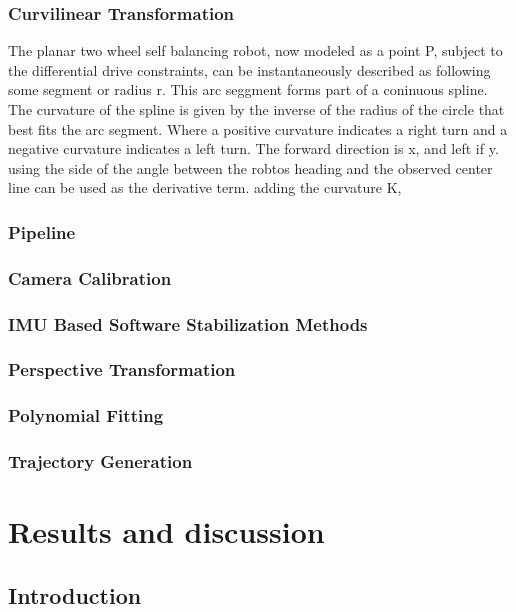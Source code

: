         \subsubsection{Curvilinear Transformation}
        The planar two wheel self balancing robot, now modeled as a point P, subject to the differential drive constraints, 
        can be instantaneously described as following some segment or radius r. This arc seggment forms part of a coninuous spline. 
        The curvature of the spline is given by the inverse of the radius of the circle that best fits the arc segment.
        Where a positive curvature indicates a right turn and a negative curvature indicates a left turn.
        The forward direction is x, and left if y. using the side of the angle between the robtos heading and the observed center line can be used as the derivative term.
        adding the curvature K, 
            \subsubsection{Pipeline}
            \subsubsection{Camera Calibration}
            \subsubsection{IMU Based Software Stabilization Methods}
            \subsubsection{Perspective Transformation}
            \subsubsection{Polynomial Fitting}
            \subsubsection{Trajectory Generation}


  \section{Results and discussion} %
    \subsection{Introduction}
